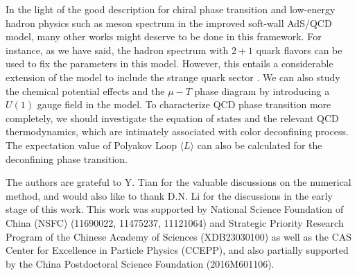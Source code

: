 \documentclass[11pt,a4paper,psfrag]{article}
\begin{document}
In the light of the good description for chiral phase transition and low-energy hadron physics such as meson spectrum in the improved soft-wall AdS/QCD model, many other works might deserve to be done in this framework. For instance, as we have said, the hadron spectrum with $2+1$ quark flavors can be used to fix the parameters in this model. However, this entails a considerable extension of the model to include the strange quark sector \cite{Sui:2010ay}. We can also study the chemical potential effects and the $\mu-T$ phase diagram by introducing a $U(1)$ gauge field in the model. To characterize QCD phase transition more completely, we should investigate the equation of states and the relevant QCD thermodynamics, which are intimately associated with color deconfining process. The expectation value of Polyakov Loop $\langle L\rangle$ can also be calculated for the deconfining phase transition.




\acknowledgments
The authors are grateful to Y. Tian for the valuable discussions on the numerical method, and would also like to thank D.N. Li for the discussions in the early stage of this work. This work was supported by National Science Foundation of China (NSFC) (11690022, 11475237, 11121064) and Strategic Priority Research Program of the Chinese Academy of Sciences (XDB23030100) as well as the CAS Center for Excellence in Particle Physics (CCEPP), and also partially supported by the China Postdoctoral Science Foundation (2016M601106).



\appendix
\end{document}
